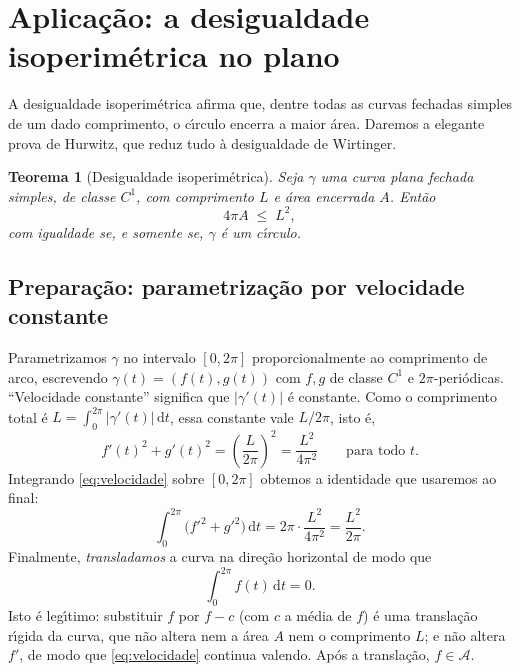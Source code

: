 \documentclass[11pt,a4paper]{amsart}
\renewcommand{\d}{\mathrm{d}}
\newcommand{\Adm}{\mathcal{A}}
\theoremstyle{plain}
\newtheorem{teorema}{Teorema}[section]
\theoremstyle{definition}
\theoremstyle{remark}
\begin{document}
\section{Aplica\c{c}\~ao: a desigualdade isoperim\'etrica no plano}
\label{sec:isop}

A desigualdade isoperim\'etrica afirma que, dentre todas as curvas fechadas
simples de um dado comprimento, o c\'\i rculo encerra a maior \'area. Daremos
a elegante prova de Hurwitz, que reduz tudo \`a desigualdade de Wirtinger.

\begin{teorema}[Desigualdade isoperim\'etrica]\label{thm:isop}
Seja $\gamma$ uma curva plana fechada simples, de classe $C^1$, com
comprimento $L$ e \'area encerrada $A$. Ent\~ao
\[
  4\pi A \;\le\; L^2 ,
\]
com igualdade se, e somente se, $\gamma$ \'e um c\'\i rculo.
\end{teorema}

\subsection{Prepara\c{c}\~ao: parametriza\c{c}\~ao por velocidade constante}

Parametrizamos $\gamma$ no intervalo $[0,2\pi]$ proporcionalmente ao
comprimento de arco, escrevendo $\gamma(t)=(f(t),g(t))$ com $f,g$ de classe
$C^1$ e $2\pi$-peri\'odicas. ``Velocidade constante'' significa que
$|\gamma'(t)|$ \'e constante. Como o comprimento total \'e
$L=\int_0^{2\pi}|\gamma'(t)|\,\d t$, essa constante vale $L/2\pi$, isto \'e,
\begin{equation}\label{eq:velocidade}
  f'(t)^2 + g'(t)^2 = \left(\frac{L}{2\pi}\right)^{\!2}
  = \frac{L^2}{4\pi^2}
  \qquad\text{para todo }t .
\end{equation}
Integrando \eqref{eq:velocidade} sobre $[0,2\pi]$ obtemos a identidade que
usaremos ao final:
\begin{equation}\label{eq:int-velocidade}
  \int_0^{2\pi}\!\big(f'^2 + g'^2\big)\,\d t
  = 2\pi\cdot\frac{L^2}{4\pi^2}
  = \frac{L^2}{2\pi} .
\end{equation}
Finalmente, \emph{transladamos} a curva na dire\c{c}\~ao horizontal de modo que
\begin{equation}\label{eq:f-media-zero}
  \int_0^{2\pi} f(t)\,\d t = 0 .
\end{equation}
Isto \'e leg\'\i timo: substituir $f$ por $f-c$ (com $c$ a m\'edia de $f$) \'e
uma transla\c{c}\~ao r\'\i gida da curva, que n\~ao altera nem a \'area $A$ nem
o comprimento $L$; e n\~ao altera $f'$, de modo que \eqref{eq:velocidade}
continua valendo. Ap\'os a transla\c{c}\~ao, $f\in\Adm$.
\end{document}
